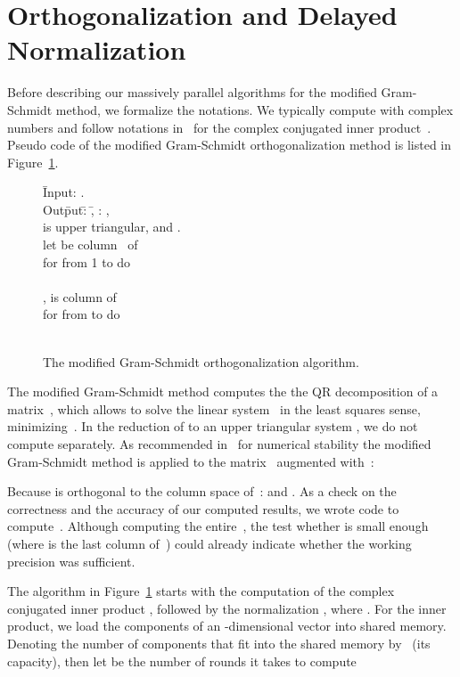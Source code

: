 \documentclass{article}
\begin{document}
\section{Orthogonalization and Delayed Normalization}

Before describing our massively parallel algorithms for the
modified Gram-Schmidt method, we formalize the notations.
We typically compute with complex numbers and follow notations
in~\cite{GV96} for the complex conjugated inner product~.
Pseudo code of the modified Gram-Schmidt orthogonalization method
is listed in Figure~\ref{figalgmgs}.
\begin{figure}[hbt]
\begin{center}
\begin{tabbing}
\hspace{8mm} \= Input: . \\
\> Out\=put\=: \= , : 
                  , \\
\>    \>   \>  \>  is upper triangular, and . \\
\> let  be column~ of~ \\
\> for  from 1 to  do \\
\>    \>  \\
\>    \> ,  is column  of~ \\
\>    \> for  from  to  do \\
\>    \>   \>  \\
\>    \>   \> 
\end{tabbing}
\caption{The modified Gram-Schmidt orthogonalization algorithm.}
\label{figalgmgs}
\end{center}
\end{figure}

The modified Gram-Schmidt method computes the 
the QR decomposition of a matrix~,
which allows to solve the linear system~
in the least squares sense, minimizing~.
In the reduction of  to an upper triangular system
, we do not compute  separately.
As recommended in~\cite[\S 19.3]{Hig96} for numerical stability 
the modified Gram-Schmidt method is applied to the matrix~
augmented with~:


Because  is orthogonal to the column space of~:
 and .
As a check on the correctness and the accuracy of our computed results, 
we wrote code to compute~.
Although computing the entire~, the test whether 
 is small enough 
(where  is the last column of~)
could already indicate whether the working precision was sufficient.

The algorithm in Figure~\ref{figalgmgs} starts with 
the computation of the complex conjugated inner product
, followed by the normalization
, where .
For the inner product, we load the components of an -dimensional vector
into shared memory.  Denoting the number of components that fit into the
shared memory by~ (its capacity), then let 
be the number of rounds it takes to compute
\end{document}
